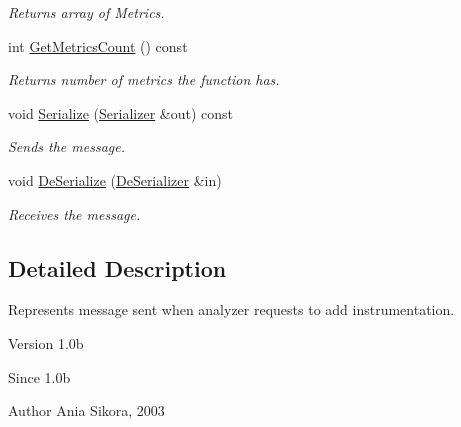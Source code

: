 \begin{DoxyCompactItemize}
\begin{DoxyCompactList}\small\item\em Returns array of Metrics. \end{DoxyCompactList}\item 
\hypertarget{class_common_1_1_add_instr_request_a2754506cc3c0fe7d7e850199f9857f41}{int \hyperlink{class_common_1_1_add_instr_request_a2754506cc3c0fe7d7e850199f9857f41}{Get\-Metrics\-Count} () const }\label{class_common_1_1_add_instr_request_a2754506cc3c0fe7d7e850199f9857f41}

\begin{DoxyCompactList}\small\item\em Returns number of metrics the function has. \end{DoxyCompactList}\item 
\hypertarget{class_common_1_1_add_instr_request_a8405b78cf676da3be84514b7838665ee}{void \hyperlink{class_common_1_1_add_instr_request_a8405b78cf676da3be84514b7838665ee}{Serialize} (\hyperlink{class_common_1_1_serializer}{Serializer} \&out) const }\label{class_common_1_1_add_instr_request_a8405b78cf676da3be84514b7838665ee}

\begin{DoxyCompactList}\small\item\em Sends the message. \end{DoxyCompactList}\item 
\hypertarget{class_common_1_1_add_instr_request_a09b4fde5119b8f7ba662cfe38b195e4a}{void \hyperlink{class_common_1_1_add_instr_request_a09b4fde5119b8f7ba662cfe38b195e4a}{De\-Serialize} (\hyperlink{class_common_1_1_de_serializer}{De\-Serializer} \&in)}\label{class_common_1_1_add_instr_request_a09b4fde5119b8f7ba662cfe38b195e4a}

\begin{DoxyCompactList}\small\item\em Receives the message. \end{DoxyCompactList}\end{DoxyCompactItemize}


\subsection{Detailed Description}
Represents message sent when analyzer requests to add instrumentation. 

\begin{DoxyVersion}{Version}
1.\-0b 
\end{DoxyVersion}
\begin{DoxySince}{Since}
1.\-0b 
\end{DoxySince}
\begin{DoxyAuthor}{Author}
Ania Sikora, 2003 
\end{DoxyAuthor}


